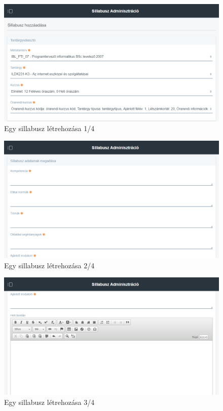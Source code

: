 \documentclass[hidelinks, 12pt, a4paper]{report}
\begin{document}
\begin{figure}[H]
    \centering
	\includegraphics[width=\textwidth]{sm_syllabus_add_1.png}
	\caption{Egy sillabusz létrehozása 1/4}
\end{figure}

\begin{figure}[H]
    \centering
	\includegraphics[width=\textwidth]{sm_syllabus_add_2.png}
	\caption{Egy sillabusz létrehozása 2/4}
\end{figure}

\begin{figure}[H]
    \centering
	\includegraphics[width=\textwidth]{sm_syllabus_add_3.png}
	\caption{Egy sillabusz létrehozása 3/4}
\end{figure}
\end{document}
